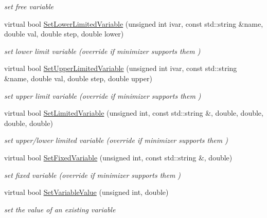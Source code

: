 \begin{DoxyCompactItemize}
\begin{DoxyCompactList}\small\item\em set free variable \end{DoxyCompactList}\item 
virtual bool \mbox{\hyperlink{classROOT_1_1Math_1_1Minimizer_a0fed20bdc58d05ce2b92d2bf47594dfb}{Set\+Lower\+Limited\+Variable}} (unsigned int ivar, const std\+::string \&name, double val, double step, double lower)
\begin{DoxyCompactList}\small\item\em set lower limit variable (override if minimizer supports them ) \end{DoxyCompactList}\item 
virtual bool \mbox{\hyperlink{classROOT_1_1Math_1_1Minimizer_a804843fbaea82809b3c54232d0c1fe86}{Set\+Upper\+Limited\+Variable}} (unsigned int ivar, const std\+::string \&name, double val, double step, double upper)
\begin{DoxyCompactList}\small\item\em set upper limit variable (override if minimizer supports them ) \end{DoxyCompactList}\item 
virtual bool \mbox{\hyperlink{classROOT_1_1Math_1_1Minimizer_a4303530cbb62ceb7cf9c9ebcbde530c2}{Set\+Limited\+Variable}} (unsigned int, const std\+::string \&, double, double, double, double)
\begin{DoxyCompactList}\small\item\em set upper/lower limited variable (override if minimizer supports them ) \end{DoxyCompactList}\item 
virtual bool \mbox{\hyperlink{classROOT_1_1Math_1_1Minimizer_a063e9d83c8a61afc8798ebb1d74b6f2b}{Set\+Fixed\+Variable}} (unsigned int, const std\+::string \&, double)
\begin{DoxyCompactList}\small\item\em set fixed variable (override if minimizer supports them ) \end{DoxyCompactList}\item 
virtual bool \mbox{\hyperlink{classROOT_1_1Math_1_1Minimizer_a47e9a16c7a0b4ecfe769ee4be048d5c3}{Set\+Variable\+Value}} (unsigned int, double)
\begin{DoxyCompactList}\small\item\em set the value of an existing variable \end{DoxyCompactList}\item 

\end{DoxyCompactItemize}
